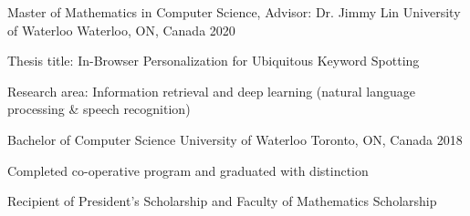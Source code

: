 


\begin{cventries}



\cventry
{Master of Mathematics in Computer Science, Advisor: Dr. Jimmy Lin} %
{University of Waterloo} %
{Waterloo, ON, Canada} %
{2020} %
{ %
\begin{cvitems}
\item {Thesis title: In-Browser Personalization for Ubiquitous Keyword Spotting}
\item {Research area: Information retrieval and deep learning (natural language processing \& speech recognition)}
\end{cvitems}
}
\cventry
{Bachelor of Computer Science} %
{University of Waterloo} %
{Toronto, ON, Canada} %
{2018} %
{ %
\begin{cvitems}
\item {Completed co-operative program and graduated with distinction}
\item {Recipient of President's Scholarship and Faculty of Mathematics Scholarship}
\end{cvitems}
}

\end{cventries}
\vspace*{-0.25cm}